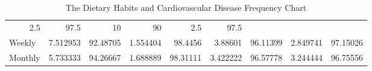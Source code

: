 \documentclass{article}
\begin{document}
\begin{table}[!h]
{\begin{tabular}{lllllllll}
				\multicolumn{1}{r}{2.5} &
				\multicolumn{1}{r}{97.5} &
				\multicolumn{1}{r}{10} &
				\multicolumn{1}{r}{90} &
				\multicolumn{1}{r}{2.5} &
				\multicolumn{1}{r}{97.5} \\
				\multicolumn{1}{l}{\hspace{5em}Weekly} &
				\multicolumn{1}{|r}{7.512953} &
				\multicolumn{1}{r}{92.48705} &
				\multicolumn{1}{r}{1.554404} &
				\multicolumn{1}{r}{98.4456} &
				\multicolumn{1}{r}{3.88601} &
				\multicolumn{1}{r}{96.11399} &
				\multicolumn{1}{r}{2.849741} &
				\multicolumn{1}{r}{97.15026} \\
				\multicolumn{1}{l}{\hspace{5em}Monthly} &
				\multicolumn{1}{|r}{5.733333} &
				\multicolumn{1}{r}{94.26667} &
				\multicolumn{1}{r}{1.688889} &
				\multicolumn{1}{r}{98.31111} &
				\multicolumn{1}{r}{3.422222} &
				\multicolumn{1}{r}{96.57778} &
				\multicolumn{1}{r}{3.244444} &
				\multicolumn{1}{r}{96.75556} \\
				\cline{1-9}
			\end{tabular}
	}
	\caption{The Dietary Habits and Cardiovascular Disease Frequency Chart}
	\label{tab:t3}
\end{table}
\end{document}
